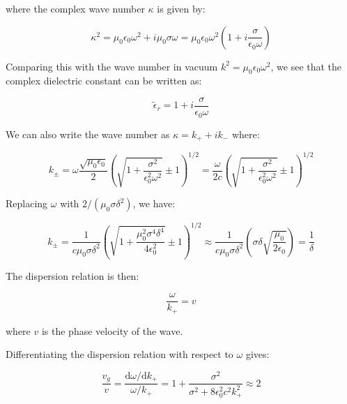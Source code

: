 \documentclass[12pt]{article}
\begin{document}
where the complex wave number $\kappa$ is given by:

\begin{equation}
    \kappa^{2} = \mu_{0} \epsilon_{0} \omega^{2} + i \mu_{0} \sigma \omega = \mu_{0} \epsilon_{0} \omega^{2} \left( 1 + i \frac{\sigma}{\epsilon_{0} \omega} \right)
\end{equation}

Comparing this with the wave number in vacuum $k^{2} = \mu_{0} \epsilon_{0} \omega^{2}$, we see that the complex dielectric constant can be written as:

\begin{equation}
    \tilde{\epsilon}_{r} = 1 + i \frac{\sigma}{\epsilon_{0} \omega}
\end{equation}

We can also write the wave number as $\kappa = k_{+} + ik_{-}$ where:

\begin{equation}
    k_{\pm} = \omega \frac{\sqrt{\mu_{0} \epsilon_{0}}}{2} \left( \sqrt{1 + \frac{\sigma^{2}}{\epsilon_{0}^{2} \omega^{2}}} \pm 1 \right)^{1/2} = \frac{\omega}{2c} \left( \sqrt{1 + \frac{\sigma^{2}}{\epsilon_{0}^{2} \omega^{2}}} \pm 1 \right)^{1/2}
\end{equation}

Replacing $\omega$ with $2/(\mu_{0} \sigma \delta^{2})$, we have:

\begin{equation}
    k_{\pm} = \frac{1}{c \mu_{0} \sigma \delta^{2}} \left( \sqrt{1 + \frac{\mu_{0}^{2} \sigma^{4} \delta^{4}}{4\epsilon_{0}^{2}}} \pm 1 \right)^{1/2} \approx \frac{1}{c \mu_{0} \sigma \delta^{2}} \left( \sigma \delta \sqrt{\frac{\mu_{0}}{2\epsilon_{0}}} \right) = \frac{1}{\delta}
\end{equation}

The dispersion relation is then:

\begin{equation}
    \frac{\omega}{k_{+}} = v
\end{equation}

where $v$ is the phase velocity of the wave.

Differentiating the dispersion relation with respect to $\omega$ gives:

\begin{equation}
    \frac{v_{g}}{v} = \frac{\mathrm{d}\omega/\mathrm{d}k_{+}}{\omega/k_{+}} = 1 + \frac{\sigma^{2}}{\sigma^{2} + 8\epsilon_{0}^{2} c^{2} k_{+}^{2}} \approx 2
\end{equation}
\end{document}
